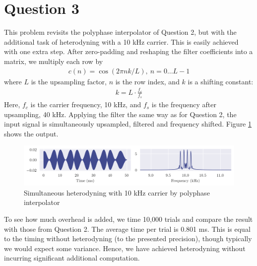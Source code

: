 \section*{Question 3}

This problem revisits the polyphase interpolator of Question 2, but with the additional task of heterodyning with a 10 kHz carrier. This is easily achieved with one extra step. After zero-padding and reshaping the filter coefficients into a matrix, we multiply each row by
\begin{align}
    c(n) = \cos(2\pi nk/L),\ n = 0 \dots L-1
\end{align}
where $L$ is the upsampling factor, $n$ is the row index, and $k$ is a shifting constant:
\begin{align}
    k = L \cdot \frac{f_c}{f_s}
\end{align}
Here, $f_c$ is the carrier frequency, 10 kHz, and $f_s$ is the frequency after upsampling, 40 kHz. Applying the filter the same way as for Question 2, the input signal is simultaneously upsampled, filtered and frequency shifted. Figure \ref{fig:q3_heterodyne} shows the output.

\begin{figure}[ht]
    \centering
    \includegraphics[width=\textwidth]{images/q3_heterodyne.png}
    \caption{Simultaneous heterodyning with 10 kHz carrier by polyphase interpolator}
    \label{fig:q3_heterodyne}
\end{figure}

To see how much overhead is added, we time 10,000 trials and compare the result with those from Question 2. The average time per trial is 0.801 ms. This is equal to the timing without heterodyning (to the presented precision), though typically we would expect some variance. Hence, we have achieved heterodyning without incurring significant additional computation.
